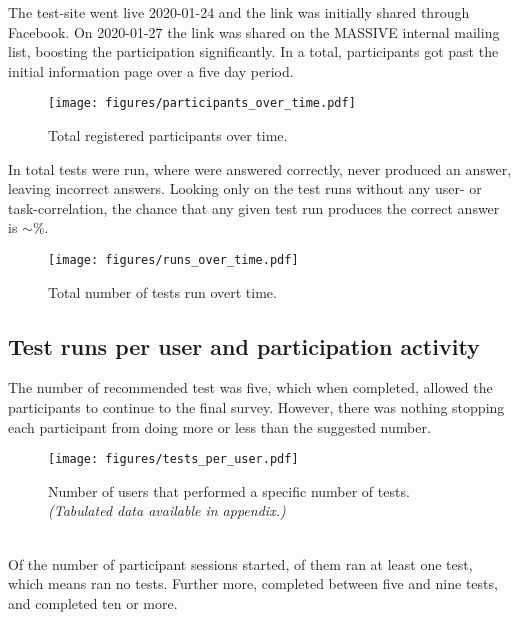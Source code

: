 \documentclass[nofilelist]{cslthse-msc}
\begin{document}
				The test-site went live 2020-01-24 and the link was initially shared
				through Facebook. On 2020-01-27 the link was shared on
				the MASSIVE internal mailing list, boosting the participation
				significantly. In a total,
				 participants got past the initial information
				page over a five day period.

				\begin{figure}[h!]
					\centering
					\texttt{[image: figures/participants\_over\_time.pdf]}
					\caption{Total registered participants over time.}
				\end{figure}

				In total  tests were run, where
				 were answered correctly,
				 never produced an answer, leaving
				 incorrect answers. Looking only on the test
				runs without any user- or task-correlation, the chance that any given test run
				produces the correct answer is $\sim$\%.

				\begin{figure}[h!]
					\centering
					\texttt{[image: figures/runs\_over\_time.pdf]}
					\caption{Total number of tests run overt time.}
				\end{figure}

			\subsection{Test runs per user and participation activity}

				The number of recommended test was five, which when completed, allowed
				the participants to continue to the final survey. However, there was
				nothing stopping each participant from doing more or less than the
				suggested number.

				\begin{figure}[h!]
					\centering
					\texttt{[image: figures/tests\_per\_user.pdf]}
					\caption{Number of users that performed a specific number of tests.
						\textit{(Tabulated data available in appendix.)}}
				\end{figure}

        \ \\
        Of the  number of participant sessions started,
        of them ran at least one test, which means  ran
        no tests. Further more,  completed between
        five and nine tests, and  completed ten or
        more.
\end{document}
